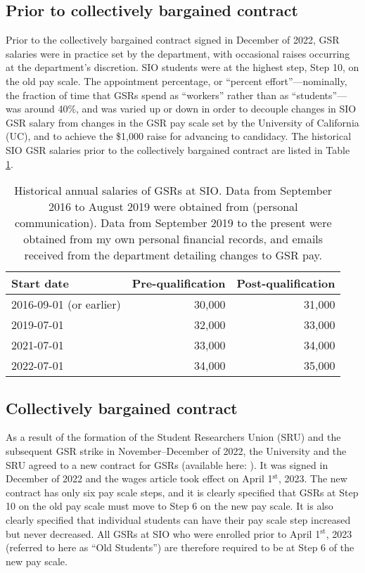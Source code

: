 \documentclass{article}
\begin{document}
\subsection{Prior to collectively bargained contract}

Prior to the collectively bargained contract signed in December of 2022, GSR salaries were in practice set by the department, with occasional raises occurring at the department's discretion. SIO students were at the highest step, Step 10, on the old pay scale. The appointment percentage, or ``percent effort''---nominally, the fraction of time that GSRs spend as ``workers'' rather than as ``students''---was around 40\%, and was varied up or down in order to decouple changes in SIO GSR salary from changes in the GSR pay scale set by the University of California (UC), and to achieve the \$1,000 raise for advancing to candidacy. The historical SIO GSR salaries prior to the collectively bargained contract are listed in Table \ref{tab:pre_contract}.

\begin{table}[h]
	\centering
	\caption{Historical annual salaries of GSRs at SIO. Data from September 2016 to August 2019 were obtained from \cite{kachelein} (personal communication). Data from September 2019 to the present were obtained from my own personal financial records, and emails received from the department detailing changes to GSR pay.}
	\label{tab:pre_contract}
	\begin{tabular}{l r r}
		\hline		
		Start date & Pre-qualification & Post-qualification \\
		\hline
		2016-09-01 (or earlier) & 30,000 & 31,000 \\
		2019-07-01 & 32,000 & 33,000 \\
		2021-07-01 & 33,000 & 34,000 \\
		2022-07-01 & 34,000 & 35,000 \\
		\hline
	\end{tabular}
\end{table}

\subsection{Collectively bargained contract}

As a result of the formation of the Student Researchers Union (SRU) and the subsequent GSR strike in November--December of 2022, the University and the SRU agreed to a new contract for GSRs (available here: \citep{gsr_contract}). It was signed in December of 2022 and the wages article took effect on April 1$^\text{st}$, 2023. The new contract has only six pay scale steps, and it is clearly specified that GSRs at Step 10 on the old pay scale must move to Step 6 on the new pay scale. It is also clearly specified that individual students can have their pay scale step increased but never decreased. All GSRs at SIO who were enrolled prior to April 1$^\text{st}$, 2023 (referred to here as ``Old Students'') are therefore required to be at Step 6 of the new pay scale.
\end{document}
